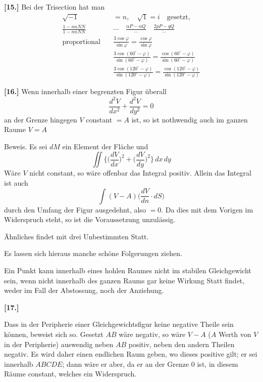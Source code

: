 \documentclass[10pt,a4paper]{article}
\begin{document}
\textbf{[15.]} Bei der Trisection hat man
%
\begin{align*}
\sqrt{-1} &= n, \quad \sqrt{1} = i \quad \text{gesetzt}, \\
\frac{1 - nnNN}{1 - nnNN} &\cdots \quad \frac{\alpha P - \alpha Q}{\cdots} \quad \frac{2pP - qQ}{\cdots} \\
\text{proportional} \quad &\frac{3\cos\varphi}{\sin\varphi} = \frac{\cos\varphi}{\sin\varphi} \\
&\frac{3\cos(60^{\circ} - \varphi)}{\sin(60^{\circ} - \varphi)} = \frac{\cos(60^{\circ} - \varphi)}{\sin(60^{\circ} - \varphi)} \\
&\frac{3\cos(120^{\circ} - \varphi)}{\sin(120^{\circ} - \varphi)} = \frac{\cos(120^{\circ} - \varphi)}{\sin(120^{\circ} - \varphi)}
\end{align*}

\textbf{[16.]} Wenn innerhalb einer begrenzten Figur \"uberall
%
\begin{equation*}
\frac{d^2V}{dx^2} + \frac{d^2V}{dy^2} = 0
\end{equation*}
%
an der Grenze hingegen $V$ constant $= A$ ist, so ist nothwendig auch im ganzen Raume $V = A$

Beweis. Es sei $dM$ ein Element der Fl\"ache und
%
\begin{equation*}
\iint \bigl\{\bigl(\frac{dV}{dx}\bigr)^2 + \bigl(\frac{dV}{dy}\bigr)^2\bigr\}\, dx\, dy
\end{equation*}
%
W\"are $V$ nicht constant, so w\"are offenbar das Integral positiv. Allein das Integral ist auch
%
\begin{equation*}
\int (V - A)\bigl(\frac{dV}{dn} \cdot dS\bigr)
\end{equation*}
%
durch den Umfang der Figur ausgedehnt, also $= 0$. Da dies mit dem Vorigen im Widerspruch steht, so ist die Voraussetzung unzul\"assig.

\"Ahnliches findet mit drei Unbestimmten Statt.

Es lassen sich hieraus manche sch\"one Folgerungen ziehen.

Ein Punkt kann innerhalb eines hohlen Raumes nicht im stabilen Gleichgewicht sein, wenn nicht innerhalb des ganzen Raums gar keine Wirkung Statt findet, weder im Fall der Abstossung, noch der Anziehung.

\newpage
\textbf{[17.]}

Dass in der Peripherie einer Gleichgewichtsfigur keine negative Theile sein k\"onnen, beweist sich so. Gesetzt $AB$ w\"are negativ, so w\"are $V - A$ ($A$ Werth von $V$ in der Peripherie) auswendig neben $AB$ positiv, neben den andern Theilen negativ. Es wird daher einen endlichen Raum geben, wo dieses positive gilt; er sei innerhalb $ABCDE$; dann w\"are er aber, da er an der Grenze 0 ist, in diesem R\"aume constant, welches ein Widerspruch.
\end{document}

